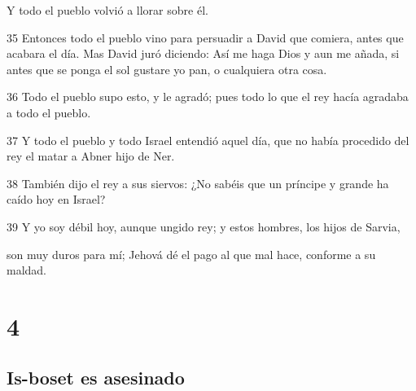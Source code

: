 \par Y todo el pueblo volvió a llorar sobre él.
\par 35 Entonces todo el pueblo vino para persuadir a David que comiera, antes que acabara el día. Mas David juró diciendo: Así me haga Dios y aun me añada, si antes que se ponga el sol gustare yo pan, o cualquiera otra cosa.
\par 36 Todo el pueblo supo esto, y le agradó; pues todo lo que el rey hacía agradaba a todo el pueblo. 
\par 37 Y todo el pueblo y todo Israel entendió aquel día, que no había procedido del rey el matar a Abner hijo de Ner.
\par 38 También dijo el rey a sus siervos: ¿No sabéis que un príncipe y grande ha caído hoy en Israel?
\par 39 Y yo soy débil hoy, aunque ungido rey; y estos hombres, los hijos de Sarvia, 
\par son muy duros para mí; Jehová dé el pago al que mal hace, conforme a su maldad.

\chapter{4}

\section*{Is-boset es asesinado}


